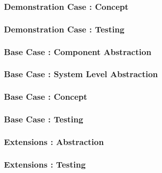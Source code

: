 
\begin{frame}[ctb!]
  \frametitle{Demonstration Case : Concept}
\end{frame}

\begin{frame}[ctb!]
  \frametitle{Demonstration Case : Testing}
\end{frame}

\begin{frame}[ctb!]
  \frametitle{Base Case : Component Abstraction}
\end{frame}

\begin{frame}[ctb!]
  \frametitle{Base Case : System Level Abstraction}
\end{frame}

\begin{frame}[ctb!]
  \frametitle{Base Case : Concept}
\end{frame}

\begin{frame}[ctb!]
  \frametitle{Base Case : Testing}
\end{frame}

\begin{frame}[ctb!]
  \frametitle{Extensions : Abstraction }
\end{frame}

\begin{frame}[ctb!]
  \frametitle{Extensions : Testing }
\end{frame}

